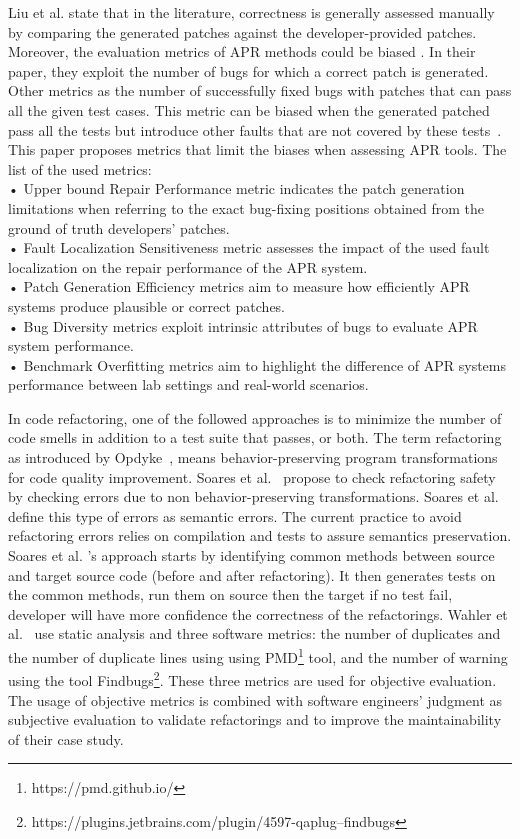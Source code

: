 Liu et al. \cite{LIU2021110817} state that in the literature, correctness is generally assessed manually by comparing the generated patches against the developer-provided patches. Moreover, the evaluation metrics of APR methods could be biased \cite{LIU2021110817}. In their paper, they exploit the number of bugs for which a correct patch is generated. Other metrics as the number of successfully fixed bugs with patches that can pass all the given test cases. This metric can be biased when the generated patched pass all the tests but introduce other faults that are not covered by these tests~\cite{LIU2021110817}.
 This paper proposes metrics that limit the biases when assessing APR tools. The list of the used metrics:\\
•  Upper bound Repair Performance metric indicates the patch generation limitations when referring to the exact bug-fixing positions obtained from the ground of truth developers’ patches. 
\\
• Fault Localization Sensitiveness metric assesses the impact of the used fault localization on the repair performance of the APR system.\\
• Patch Generation Efficiency metrics aim to measure how efficiently APR systems produce plausible or correct patches.\\
• Bug Diversity metrics exploit intrinsic attributes of bugs to evaluate APR system performance.\\
• Benchmark Overfitting metrics aim to highlight the difference of APR systems performance between lab settings and real-world scenarios.

In code refactoring, one of the followed approaches is to minimize the number of code smells in addition to a test suite that passes, or both.
The term refactoring as introduced by Opdyke~\cite{10.5555/169783}, means behavior-preserving program transformations for code quality improvement. 
Soares et al.~\cite{soares2009generating} propose to check refactoring safety by checking errors due to non behavior-preserving transformations. Soares et al.~\cite{soares2009generating} define this type of errors as semantic errors. The current practice to avoid refactoring errors relies on compilation and tests to assure semantics preservation. Soares et al. \cite{soares2009generating}'s approach starts by identifying common methods between source and target source code (before and after refactoring). It then generates tests on the common methods, run them on source then the target if no test fail, developer will have more confidence the correctness of the refactorings.
Wahler et al.~\cite{7816501} use static analysis and three software metrics: the number of duplicates and the number of duplicate lines using using PMD\footnote{https://pmd.github.io/} tool, and the number of warning using the tool Findbugs\footnote{https://plugins.jetbrains.com/plugin/4597-qaplug--findbugs}. These three metrics are used for objective evaluation. The usage of objective metrics is combined with software engineers' judgment as subjective evaluation to validate refactorings and to improve the maintainability of their case study.

